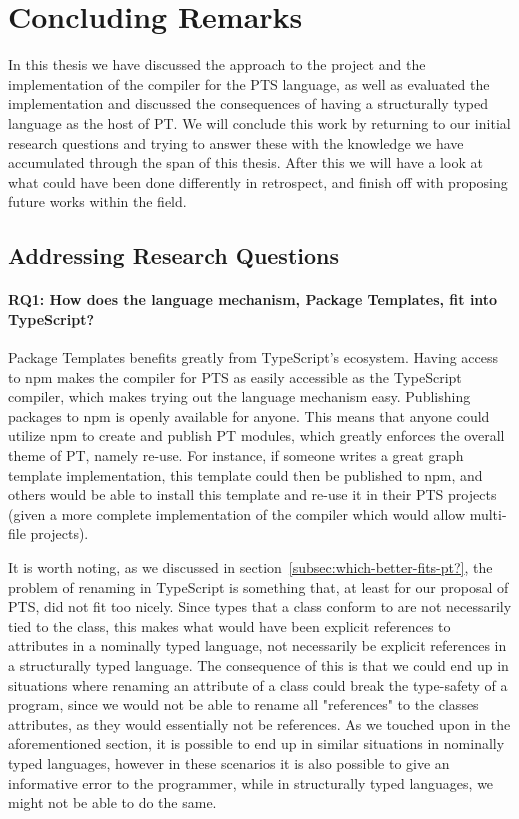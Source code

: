 \chapter{Concluding Remarks}\label{ch:results}

In this thesis we have discussed the approach to the project and the implementation of the compiler for the PTS language, as well as evaluated the implementation and discussed the consequences of having a structurally typed language as the host of PT\@.
We will conclude this work by returning to our initial research questions and trying to answer these with the knowledge we have accumulated through the span of this thesis.
After this we will have a look at what could have been done differently in retrospect, and finish off with proposing future works within the field.


\section{Addressing Research Questions}\label{sec:adressing-research-questions}


\subsubsection{RQ1: How does the language mechanism, Package Templates, fit into TypeScript?}

Package Templates benefits greatly from TypeScript's ecosystem.
Having access to npm makes the compiler for PTS as easily accessible as the TypeScript compiler, which makes trying out the language mechanism easy.
Publishing packages to npm is openly available for anyone.
This means that anyone could utilize npm to create and publish PT modules, which greatly enforces the overall theme of PT, namely re-use.
For instance, if someone writes a great graph template implementation, this template could then be published to npm, and others would be able to install this template and re-use it in their PTS projects (given a more complete implementation of the compiler which would allow multi-file projects).

It is worth noting, as we discussed in section~\vref{subsec:which-better-fits-pt?}, the problem of renaming in TypeScript is something that, at least for our proposal of PTS, did not fit too nicely.
Since types that a class conform to are not necessarily tied to the class, this makes what would have been explicit references to attributes in a nominally typed language, not necessarily be explicit references in a structurally typed language.
The consequence of this is that we could end up in situations where renaming an attribute of a class could break the type-safety of a program, since we would not be able to rename all "references" to the classes attributes, as they would essentially not be references.
As we touched upon in the aforementioned section, it is possible to end up in similar situations in nominally typed languages, however in these scenarios it is also possible to give an informative error to the programmer, while in structurally typed languages, we might not be able to do the same.

